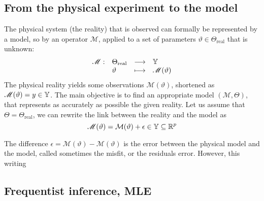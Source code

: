 \documentclass[../../Main_ManuscritThese.tex]{subfiles}
\begin{document}
\subsection{From the physical experiment to the model}
\label{ssec:inv_problem}
The physical system (the reality) that is observed can formally be represented by a model, so by an operator $\mathscr{M}$, applied to a set of parameters $\vartheta \in \Theta_{\mathrm{real}}$ that is unknown:
\begin{equation}
  \begin{array}{llll}
    \mathscr{M} :& \Theta_{\mathrm{real}} &\longrightarrow& \mathbb{Y} \\
                 & \vartheta & \longmapsto& \mathscr{M}(\vartheta)
  \end{array}
\end{equation}
The physical reality yields some observations $\mathscr{M}(\vartheta)$, shortened as $\mathscr{M}(\vartheta) = y\in\mathbb{Y}$.
\cite{kennedy_bayesian_2001,higdon_combining_2004}
The main objective is to find an appropriate model $(\mathcal{M},\Theta)$, that represents as accurately as possible the given reality.
Let us assume that $\Theta = \Theta_{\mathrm{real}}$, we can rewrite the link between the reality and the model as
\begin{equation}
    \mathscr{M}(\vartheta) = %
    \mathcal{M}(\vartheta) + \epsilon \in \Yspace \subseteq \mathbb{R}^p
  \end{equation}
  
The difference $\epsilon = \mathscr{M}(\vartheta) - \mathcal{M}(\vartheta)$ is the error between the physical model and the model, called sometimes the misfit, or the residuals error. However, this writing 

\subsection{Frequentist inference, MLE}
\label{sec:frequentist_inference_MLE}
\end{document}

